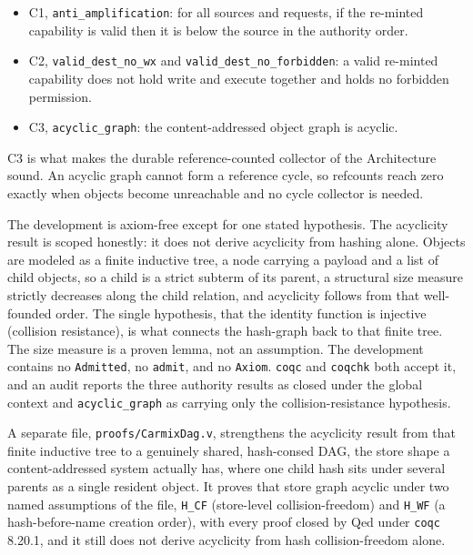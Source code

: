 \documentclass[10pt,twocolumn]{article}
\begin{document}
\begin{itemize}
\item C1, \texttt{anti\_amplification}: for all sources and requests, if the
re-minted capability is valid then it is below the source in the authority order.
\item C2, \texttt{valid\_dest\_no\_wx} and \texttt{valid\_dest\_no\_forbidden}: a
valid re-minted capability does not hold write and execute together and holds no
forbidden permission.
\item C3, \texttt{acyclic\_graph}: the content-addressed object graph is acyclic.
\end{itemize}

C3 is what makes the durable reference-counted collector of the Architecture
sound. An acyclic graph cannot form a reference cycle, so refcounts reach zero
exactly when objects become unreachable and no cycle collector is needed.

The development is axiom-free except for one stated hypothesis. The acyclicity
result is scoped honestly: it does not derive acyclicity from hashing alone.
Objects are modeled as a finite inductive tree, a node carrying a payload and a
list of child objects, so a child is a strict subterm of its parent, a structural
size measure strictly decreases along the child relation, and acyclicity follows
from that well-founded order. The single hypothesis, that the identity function is
injective (collision resistance), is what connects the hash-graph back to that
finite tree. The size measure is a proven lemma, not an assumption. The
development contains no \texttt{Admitted}, no \texttt{admit}, and no
\texttt{Axiom}. \texttt{coqc} and \texttt{coqchk} both accept it, and an audit
reports the three authority results as closed under the global context and
\texttt{acyclic\_graph} as carrying only the collision-resistance hypothesis.

A separate file, \texttt{proofs/CarmixDag.v}, strengthens the acyclicity result
from that finite inductive tree to a genuinely shared, hash-consed DAG, the store
shape a content-addressed system actually has, where one child hash sits under
several parents as a single resident object. It proves that store graph acyclic
under two named assumptions of the file, \texttt{H\_CF} (store-level
collision-freedom) and \texttt{H\_WF} (a hash-before-name creation order), with
every proof closed by Qed under \texttt{coqc} 8.20.1, and it still does not derive
acyclicity from hash collision-freedom alone.
\end{document}
